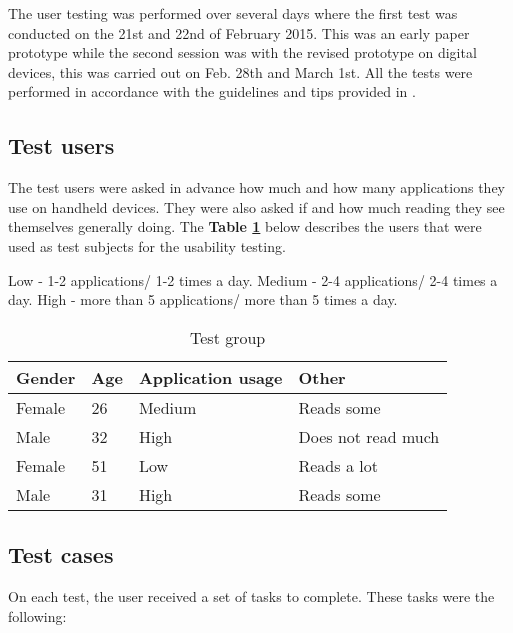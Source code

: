 The user testing was performed over several days where the first test was conducted on the 21st and 22nd of February 2015. This was an early paper prototype while the second session was with the revised prototype on digital devices\cite{protoIO}, this was carried out on Feb. 28th and March 1st. All the tests were performed in accordance with the guidelines and tips provided in \cite{shneiderman2014}.

\subsection{Test users}

The test users were asked in advance how much and how many applications they use on handheld devices. They were also asked if and how much reading they see themselves generally doing. The \textbf{Table \ref{Tab:testgroup}} below describes the users that were used as test subjects for the usability testing.  \newline

Low - 1-2 applications/ 1-2 times a day.\newline
Medium - 2-4 applications/ 2-4 times a day.\newline
High - more than 5 applications/ more than 5 times a day.

\begin{table}[H]
	\caption{Test group}
	\label{Tab:testgroup}
	\begin{adjustbox}{center}
		\begin{tabular}{ | l | l | l | l |}
			\hline
			\textbf{Gender} & \textbf{Age} & \textbf{Application usage} & \textbf{Other} \\ \hline
			Female & 26 & Medium & Reads some \\\hline
			Male & 32 & High & Does not read much \\\hline
			Female & 51 & Low & Reads a lot \\\hline
			Male & 31 & High & Reads some \\\hline 	
		\end{tabular}
	\end{adjustbox}
\end{table}

\subsection{Test cases}

On each test, the user received a set of tasks to complete. These tasks were the following:


